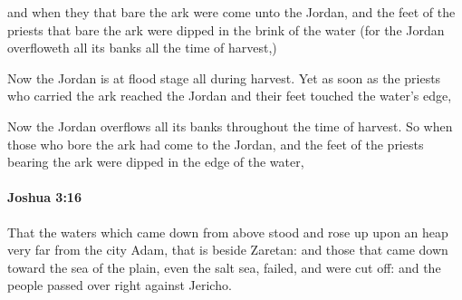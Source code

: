 			\begin{versebox}
					\item[BHS] 
					\item[ASV] and when they that bare the ark were come unto the Jordan, and the feet of the priests that bare the ark were dipped in the brink of the water (for the Jordan overfloweth all its banks all the time of harvest,)
					\item[NIV] Now the Jordan is at flood stage all during harvest. Yet as soon as the priests who carried the ark reached the Jordan and their feet touched the water’s edge,
					\item[NRSV] Now the Jordan overflows all its banks throughout the time of harvest. So when those who bore the ark had come to the Jordan, and the feet of the priests bearing the ark were dipped in the edge of the water,
			\end{versebox}

		\paragraph{Joshua 3:16} %
			\label{JOSHUA-3-16}

			That the waters which came down from above stood and rose up upon an heap very far from the city Adam, that is beside Zaretan: and those that came down toward the sea of the plain, even the salt sea, failed, and were cut off: and the people passed over right against Jericho.


